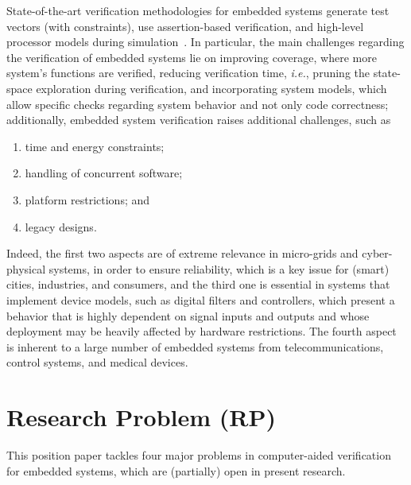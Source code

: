 \documentclass{acm_sen_article}
\begin{document}
State-of-the-art verification methodologies for embedded systems generate test vectors (with constraints), use assertion-based verification, and high-level processor models during simulation~\cite{Behrend15,Lettnin09}. In particular, the main challenges regarding the verification of embedded systems lie on improving coverage, where more system's functions are verified, reducing verification time, {\it i.e.}, pruning the state-space exploration during verification, and incorporating system models, which allow specific checks regarding system behavior and not only code correctness; additionally, embedded system verification raises additional challenges, such as 
%
\begin{enumerate}
	\item time and energy constraints;
	\item handling of concurrent software;
	\item platform restrictions; and
	\item legacy designs.%
\end{enumerate}

Indeed, the first two aspects are of extreme relevance in micro-grids and cyber-physical systems, in order to ensure reliability, which is a key issue for (smart) cities, industries, and consumers, and the third one is essential in systems that implement device models, such as digital filters and controllers, which present a behavior that is highly dependent on signal inputs and outputs and whose deployment may be heavily affected by hardware restrictions. The fourth aspect is inherent to a large number of embedded systems from  telecommunications, control systems, and medical devices.


\section{Research Problem (RP)}

This position paper tackles four major problems in computer-aided verification for embedded systems, which are (partially) open in present research.
\end{document}

